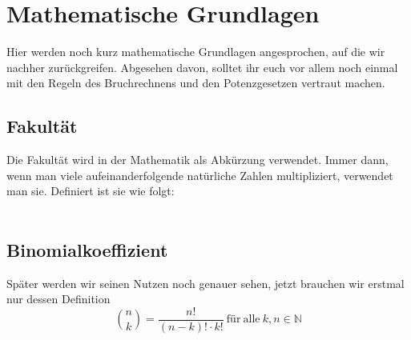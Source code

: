 \section{Mathematische Grundlagen}
	Hier werden noch kurz mathematische Grundlagen angesprochen, auf die wir
	nachher zurückgreifen. Abgesehen davon, solltet ihr euch vor allem noch einmal
	mit den Regeln des Bruchrechnens und den Potenzgesetzen vertraut machen.

	\subsection{Fakultät}
		Die Fakultät wird in der Mathematik als Abkürzung verwendet. Immer dann, wenn
		man viele aufeinanderfolgende natürliche Zahlen multipliziert, verwendet man
		sie. Definiert ist sie wie folgt:
		\\ \\
		\formel{\[n!=1\cdot 2\cdot \ldots \cdot (n-1)\cdot n\ \&\ 0!=1\]}

	\subsection{Binomialkoeffizient}
		Später werden wir seinen Nutzen noch genauer sehen, jetzt brauchen wir erstmal
		nur dessen Definition
		\[\binom{n}{k}=\frac{n!}{(n-k)!\cdot k!}\mathrm{\ für\ alle\ }k,n\in
		\mathbb{N}\]

